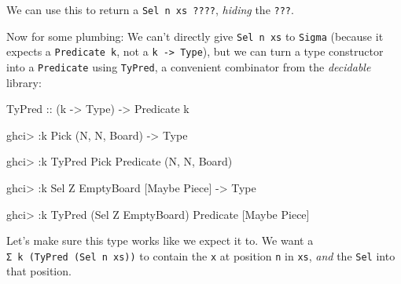 \documentclass[]{article}
\newenvironment{Shaded}{}{}
\newcommand{\DataTypeTok}[1]{\textcolor[rgb]{0.56,0.13,0.00}{#1}}
\newcommand{\NormalTok}[1]{#1}
\newcommand{\OperatorTok}[1]{\textcolor[rgb]{0.40,0.40,0.40}{#1}}
\newcommand{\OtherTok}[1]{\textcolor[rgb]{0.00,0.44,0.13}{#1}}
\begin{document}
We can use this to return a \texttt{Sel\ n\ xs\ ????}, \emph{hiding} the
\texttt{???}.

Now for some plumbing: We can't directly give \texttt{Sel\ n\ xs} to
\texttt{Sigma} (because it expects a \texttt{Predicate\ k}, not a
\texttt{k\ -\textgreater{}\ Type}), but we can turn a type constructor into a
\texttt{Predicate} using \texttt{TyPred}, a convenient combinator from the
\emph{decidable} library:

\begin{Shaded}
\begin{Highlighting}[]
\DataTypeTok{TyPred}\OtherTok{ ::}\NormalTok{ (k }\OtherTok{{-}\textgreater{}} \DataTypeTok{Type}\NormalTok{) }\OtherTok{{-}\textgreater{}} \DataTypeTok{Predicate}\NormalTok{ k}
\end{Highlighting}
\end{Shaded}

\begin{Shaded}
\begin{Highlighting}[]
\NormalTok{ghci}\OperatorTok{\textgreater{}} \OperatorTok{:}\NormalTok{k }\DataTypeTok{Pick}
\NormalTok{(}\DataTypeTok{N}\NormalTok{, }\DataTypeTok{N}\NormalTok{, }\DataTypeTok{Board}\NormalTok{) }\OtherTok{{-}\textgreater{}} \DataTypeTok{Type}

\NormalTok{ghci}\OperatorTok{\textgreater{}} \OperatorTok{:}\NormalTok{k }\DataTypeTok{TyPred} \DataTypeTok{Pick}
\DataTypeTok{Predicate}\NormalTok{ (}\DataTypeTok{N}\NormalTok{, }\DataTypeTok{N}\NormalTok{, }\DataTypeTok{Board}\NormalTok{)}

\NormalTok{ghci}\OperatorTok{\textgreater{}} \OperatorTok{:}\NormalTok{k }\DataTypeTok{Sel} \DataTypeTok{\textquotesingle{}Z} \DataTypeTok{EmptyBoard}
\NormalTok{[}\DataTypeTok{Maybe} \DataTypeTok{Piece}\NormalTok{] }\OtherTok{{-}\textgreater{}} \DataTypeTok{Type}

\NormalTok{ghci}\OperatorTok{\textgreater{}} \OperatorTok{:}\NormalTok{k }\DataTypeTok{TyPred}\NormalTok{ (}\DataTypeTok{Sel} \DataTypeTok{\textquotesingle{}Z} \DataTypeTok{EmptyBoard}\NormalTok{)}
\DataTypeTok{Predicate}\NormalTok{ [}\DataTypeTok{Maybe} \DataTypeTok{Piece}\NormalTok{]}
\end{Highlighting}
\end{Shaded}

Let's make sure this type works like we expect it to. We want a
\texttt{Σ\ k\ (TyPred\ (Sel\ n\ xs))} to contain the \texttt{x} at position
\texttt{n} in \texttt{xs}, \emph{and} the \texttt{Sel} into that position.
\end{document}
